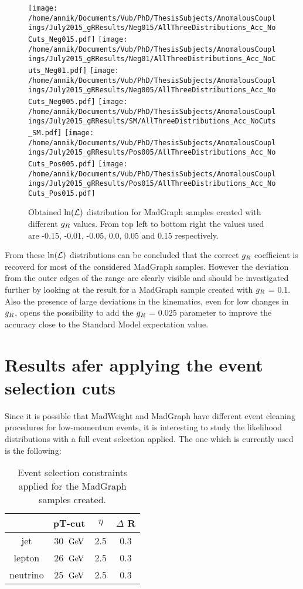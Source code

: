 \begin{figure}[h!t]
 \centering
 \texttt{[image: /home/annik/Documents/Vub/PhD/ThesisSubjects/AnomalousCouplings/July2015\_gRResults/Neg015/AllThreeDistributions\_Acc\_NoCuts\_Neg015.pdf]}
 \texttt{[image: /home/annik/Documents/Vub/PhD/ThesisSubjects/AnomalousCouplings/July2015\_gRResults/Neg01/AllThreeDistributions\_Acc\_NoCuts\_Neg01.pdf]}
 \texttt{[image: /home/annik/Documents/Vub/PhD/ThesisSubjects/AnomalousCouplings/July2015\_gRResults/Neg005/AllThreeDistributions\_Acc\_NoCuts\_Neg005.pdf]}
 \texttt{[image: /home/annik/Documents/Vub/PhD/ThesisSubjects/AnomalousCouplings/July2015\_gRResults/SM/AllThreeDistributions\_Acc\_NoCuts\_SM.pdf]}
 \texttt{[image: /home/annik/Documents/Vub/PhD/ThesisSubjects/AnomalousCouplings/July2015\_gRResults/Pos005/AllThreeDistributions\_Acc\_NoCuts\_Pos005.pdf]}
 \texttt{[image: /home/annik/Documents/Vub/PhD/ThesisSubjects/AnomalousCouplings/July2015\_gRResults/Pos015/AllThreeDistributions\_Acc\_NoCuts\_Pos015.pdf]}
 \caption{Obtained $\ln(\mathcal{L})$ distribution for MadGraph samples created with different $g_{R}$ values. From top left to bottom right the values used are -0.15, -0.01, -0.05, 0.0, 0.05 and 0.15 respectively.}
 \label{fig::gRResultsNoCut}
\end{figure}

From these $\ln(\mathcal{L})$ distributions can be concluded that the correct $g_{R}$ coefficient is recoverd for most of the considered MadGraph samples. However the deviation from the outer edges of the range are clearly visible and should be investigated further by looking at the result for a MadGraph sample created with $g_{R}$ = 0.1.\\
Also the presence of large deviations in the kinematics, even for low changes in $g_{R}$, opens the possibility to add the $g_{R}$ = 0.025 parameter to improve the accuracy close to the Standard Model expectation value.

\section{Results afer applying the event selection cuts}
Since it is possible that MadWeight and MadGraph have different event cleaning procedures for low-momentum events, it is interesting to study the likelihood distributions with a full event selection applied. The one which is currently used is the following:
\begin{table}[h!]
 \centering
 \caption{Event selection constraints applied for the MadGraph samples created.}\label{table::EvtSelCutsgR}
 \begin{tabular}{c|c|c|c}
		& pT-cut 	& $\eta$ 	& $\Delta$ R 	\\
  \hline
  jet 		& 30 $\, \mathrm{GeV}$ 	& 2.5 		& 0.3 		\\
  lepton 	& 26 $\, \mathrm{GeV}$ 	& 2.5 		& 0.3 		\\
  neutrino 	& 25 $\, \mathrm{GeV}$ 	& 2.5 		& 0.3
 \end{tabular}
\end{table}

